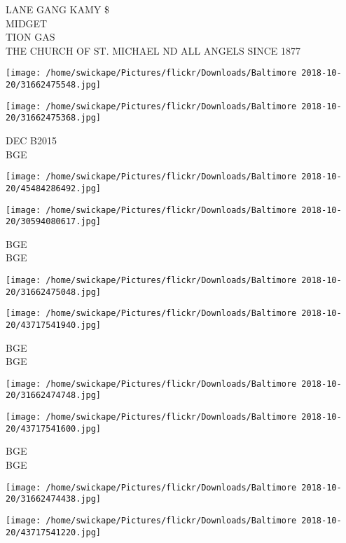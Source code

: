 \documentclass[10pt,letterpaper]{article}
\begin{document}
LANE GANG KAMY \$\\
MIDGET\\
TION GAS\\
THE CHURCH OF ST. MICHAEL ND ALL ANGELS SINCE 1877\\
\pagebreak

\texttt{[image: /home/swickape/Pictures/flickr/Downloads/Baltimore 2018-10-20/31662475548.jpg]}

\vspace{0.25in}
\texttt{[image: /home/swickape/Pictures/flickr/Downloads/Baltimore 2018-10-20/31662475368.jpg]}

DEC B2015\\
BGE\\
\pagebreak

\texttt{[image: /home/swickape/Pictures/flickr/Downloads/Baltimore 2018-10-20/45484286492.jpg]}

\vspace{0.25in}
\texttt{[image: /home/swickape/Pictures/flickr/Downloads/Baltimore 2018-10-20/30594080617.jpg]}

BGE\\
BGE\\
\pagebreak

\texttt{[image: /home/swickape/Pictures/flickr/Downloads/Baltimore 2018-10-20/31662475048.jpg]}

\vspace{0.25in}
\texttt{[image: /home/swickape/Pictures/flickr/Downloads/Baltimore 2018-10-20/43717541940.jpg]}

BGE\\
BGE\\
\pagebreak

\texttt{[image: /home/swickape/Pictures/flickr/Downloads/Baltimore 2018-10-20/31662474748.jpg]}

\vspace{0.25in}
\texttt{[image: /home/swickape/Pictures/flickr/Downloads/Baltimore 2018-10-20/43717541600.jpg]}

BGE\\
BGE\\
\pagebreak

\texttt{[image: /home/swickape/Pictures/flickr/Downloads/Baltimore 2018-10-20/31662474438.jpg]}

\vspace{0.25in}
\texttt{[image: /home/swickape/Pictures/flickr/Downloads/Baltimore 2018-10-20/43717541220.jpg]}
\end{document}
